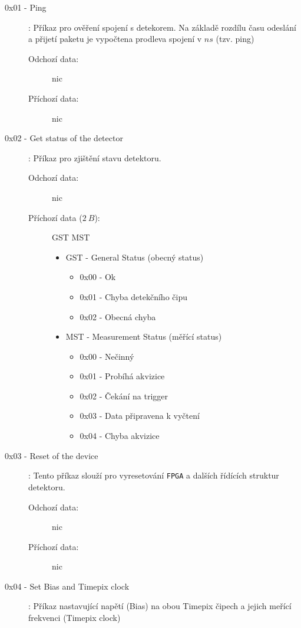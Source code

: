 \begin{description}
	\item[0x01 - Ping]:
		Příkaz pro ověření spojení s detekorem. Na základě rozdílu času odeslání a přijetí paketu je vypočtena prodleva spojení v $ns$ (tzv. ping)
		\begin{description}
			\item[Odchozí data:] nic
			\item[Příchozí data:] nic
		\end{description}
	\item[0x02 - Get status of the detector]:
		Příkaz pro zjištění stavu detektoru.	
		\begin{description}
			\item[Odchozí data:] nic
			\item[Příchozí data ($2~B$):] GST MST
				\begin{itemize}
					\item GST - General Status (obecný status)
						\begin{itemize}
							\item 0x00 - Ok
							\item 0x01 - Chyba detekčního čipu
							\item 0x02 - Obecná chyba
						\end{itemize}
					\item MST - Measurement Status (měřící status)
						\begin{itemize}
							\item 0x00 - Nečinný
							\item 0x01 - Probíhá akvizice
							\item 0x02 - Čekání na trigger
							\item 0x03 - Data připravena k vyčtení
							\item 0x04 - Chyba akvizice
						\end{itemize}
				\end{itemize}
		\end{description}
	\item[0x03 - Reset of the device]:
		Tento příkaz slouží pro vyresetování \texttt{FPGA} a dalších řídících struktur detektoru.
		\begin{description}
			\item[Odchozí data:] nic
			\item[Příchozí data:] nic
		\end{description}
	\item[0x04 - Set Bias and Timepix clock]:
		Příkaz nastavující napětí (Bias) na obou Timepix čipech a jejich meřící frekvenci (Timepix clock)

\end{description}
